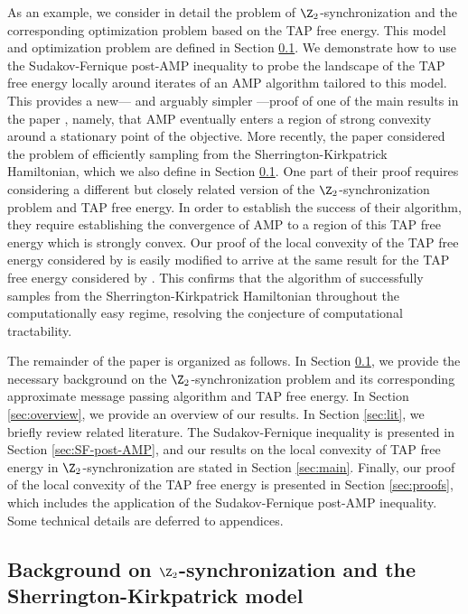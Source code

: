 \documentclass[]{article}
\begin{document}
As an example, 
we consider in detail the problem of $\Z_2$-synchronization and the corresponding optimization problem based on the TAP free energy.
This model and optimization problem are defined in Section \ref{sec:Z2-intro}. 
We demonstrate how to use the Sudakov-Fernique post-AMP inequality to probe the landscape of the TAP free energy locally around iterates of an AMP algorithm tailored to this model.
This provides a new--- and arguably simpler ---proof of one of the main results in the paper \cite{celentanoFanMei2021},
namely, that AMP eventually enters a region of strong convexity around a stationary point of the objective. 
More recently, 
the paper \cite{AlaouiMontanariSelke2022} considered the problem of efficiently sampling from the Sherrington-Kirkpatrick Hamiltonian,
which we also define in Section \ref{sec:Z2-intro}.
One part of their proof requires considering a different but closely related version of the $\Z_2$-synchronization problem and TAP free energy.
In order to establish the success of their algorithm,
they require establishing the convergence of AMP to a region of this TAP free energy which is strongly convex. 
Our proof of the local convexity of the TAP free energy considered by \cite{celentanoFanMei2021} is easily modified to arrive at the same result for the TAP free energy considered by \cite{AlaouiMontanariSelke2022}.
This confirms that the algorithm of \cite{AlaouiMontanariSelke2022}
successfully samples from the Sherrington-Kirkpatrick Hamiltonian throughout the computationally easy regime,
resolving the conjecture of computational tractability.

The remainder of the paper is organized as follows. 
In Section \ref{sec:Z2-intro}, 
we provide the necessary background on the $\Z_2$-synchronization problem and its corresponding approximate message passing algorithm and TAP free energy.
In Section \ref{sec:overview},
we provide an overview of our results.
In Section \ref{sec:lit},
we briefly review related literature.
The Sudakov-Fernique inequality is presented in Section \ref{sec:SF-post-AMP},
and our results on the local convexity of TAP free energy in $\Z_2$-synchronization are stated in Section \ref{sec:main}.
Finally, our proof of the local convexity of the TAP free energy is presented in Section \ref{sec:proofs}, which includes the application of the Sudakov-Fernique post-AMP inequality.
Some technical details are deferred to appendices.

\subsection{Background on $\Z_2$-synchronization and the Sherrington-Kirkpatrick model}
\label{sec:Z2-intro}
\end{document}
